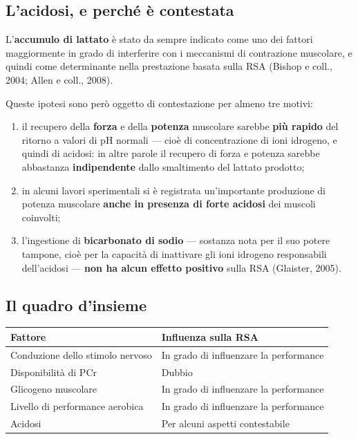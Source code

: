\subsection{L'acidosi, e perché è contestata}

L'\textbf{accumulo di lattato} è stato da sempre indicato come uno dei fattori maggiormente in grado
di interferire con i meccanismi di contrazione muscolare, e quindi come determinante nella
prestazione basata sulla RSA (Bishop e coll., 2004; Allen e coll., 2008).

Queste ipotesi sono però oggetto di contestazione per almeno tre motivi:

\begin{enumerate}
  \item il recupero della \textbf{forza} e della \textbf{potenza} muscolare sarebbe \textbf{più
    rapido} del ritorno a valori di pH normali --- cioè di concentrazione di ioni idrogeno, e quindi
    di acidosi: in altre parole il recupero di forza e potenza sarebbe abbastanza
    \textbf{indipendente} dallo smaltimento del lattato prodotto;
  \item in alcuni lavori sperimentali si è registrata un'importante produzione di potenza muscolare
    \textbf{anche in presenza di forte acidosi} dei muscoli coinvolti;
  \item l'ingestione di \textbf{bicarbonato di sodio} --- sostanza nota per il suo potere tampone,
    cioè per la capacità di inattivare gli ioni idrogeno responsabili dell'acidosi --- \textbf{non ha
    alcun effetto positivo} sulla RSA (Glaister, 2005).
\end{enumerate}

\subsection{Il quadro d'insieme}

\begin{table}[htbp]
  \centering
  \small
  \renewcommand{\arraystretch}{1.3}
  \begin{tabularx}{\textwidth}{|X|X|}
    \hline
    \textbf{Fattore} & \textbf{Influenza sulla RSA} \\
    \hline
    Conduzione dello stimolo nervoso & In grado di influenzare la performance \\
    \hline
    Disponibilità di PCr & Dubbio \\
    \hline
    Glicogeno muscolare & In grado di influenzare la performance \\
    \hline
    Livello di performance aerobica & In grado di influenzare la performance \\
    \hline
    Acidosi & Per alcuni aspetti contestabile \\
    \hline
  \end{tabularx}
\end{table}

